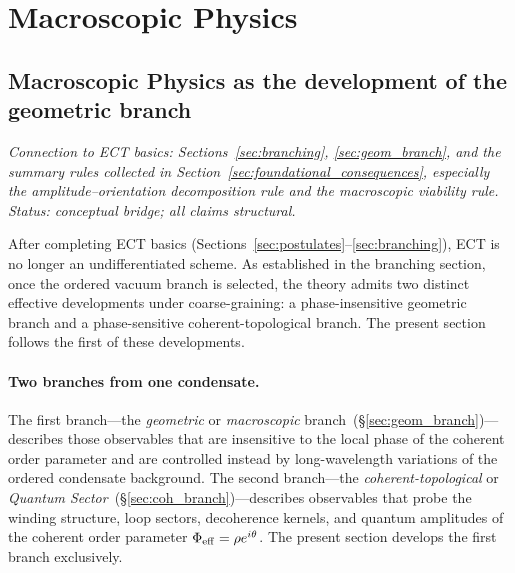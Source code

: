 \documentclass[11pt,a4paper]{article}
\numberwithin{equation}{section}
\begin{document}
\section{Macroscopic Physics}
\label{sec:macroscopic}

\subsection{Macroscopic Physics as the development
of the geometric branch}
\label{sec:mp_intro}

\textit{Connection to ECT basics:
Sections~\ref{sec:branching}, \ref{sec:geom_branch},
and the summary rules collected in
Section~\ref{sec:foundational_consequences}, especially the
amplitude--orientation decomposition rule and the macroscopic
viability rule.
Status: conceptual bridge; all claims structural.}

\medskip
After completing ECT basics
(Sections~\ref{sec:postulates}--\ref{sec:branching}),
ECT is no longer an undifferentiated scheme.
As established in the branching section, once the ordered vacuum
branch is selected, the theory admits two distinct effective
developments under coarse-graining: a phase-insensitive geometric
branch and a phase-sensitive coherent-topological branch.
The present section follows the first of these developments.

\paragraph{Two branches from one condensate.}
The first branch---the \emph{geometric} or \emph{macroscopic}
branch~(\S\ref{sec:geom_branch})---describes those observables
that are insensitive to the local phase of the coherent order
parameter and are controlled instead by long-wavelength variations
of the ordered condensate background.
The second branch---the \emph{coherent-topological} or
\emph{Quantum Sector}~(\S\ref{sec:coh_branch})---describes
observables that probe the winding structure, loop sectors,
decoherence kernels, and quantum amplitudes of the coherent
order parameter $\Phi_{\rm eff}=\rho e^{i\theta}$.
The present section develops the first branch exclusively.
\end{document}
